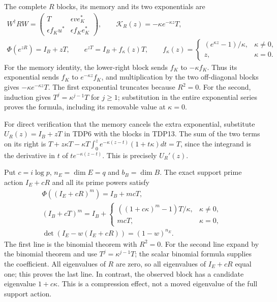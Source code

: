 The complete $R$ blocks, its memory and its two exponentials are
\begin{equation}\tag{TDP13}
\begin{gathered}
W^\dagger RW=
\begin{pmatrix}T&\epsilon ve_K^*\\
 \epsilon f_Ku^*&\epsilon f_Ke_K^*\end{pmatrix},\qquad
\mathcal K_R(z)=-\kappa e^{-\kappa z}T,\\
\Phi(e^{zR})=I_B+zT,\qquad
e^{zT}=I_B+f_\kappa(z)T,\qquad
f_\kappa(z)=\begin{cases}(e^{\kappa z}-1)/\kappa,&\kappa\ne0,\\
z,&\kappa=0.
\end{cases}
\end{gathered}
\end{equation}
For the memory identity, the lower-right block sends $f_K$ to
$-\kappa f_K$. Thus its exponential sends $f_K$ to
$e^{-\kappa z}f_K$, and multiplication by the two off-diagonal blocks
gives $-\kappa e^{-\kappa z}T$. The first exponential truncates because
$R^2=0$. For the second, induction gives $T^j=\kappa^{j-1}T$ for $j\ge1$;
substitution in the entire exponential series proves the formula,
including its removable value at $\kappa=0$.

For direct verification that the memory cancels the extra exponential,
substitute $U_R(z)=I_B+zT$ in TDP6 with the blocks in TDP13. The sum of
the two terms on its right is
$T+z\kappa T-\kappa T\int_0^z e^{-\kappa(z-t)}(1+t\kappa)dt=T$,
since the integrand is the derivative in $t$ of
$t e^{-\kappa(z-t)}$. This is precisely $U_R'(z)$.

Put $c=i\log p$, $n_E=\dim E=q$ and $b_B=\dim B$. The exact support
prime action $I_E+cR$ and all its prime powers satisfy
\begin{equation}\tag{TDP14}
\begin{gathered}
\Phi((I_E+cR)^m)=I_B+mcT,\\
(I_B+cT)^m=I_B+
\begin{cases}((1+c\kappa)^m-1)T/\kappa,&\kappa\ne0,\\
mcT,&\kappa=0,
\end{cases}\\
\det(I_E-w(I_E+cR))=(1-w)^{n_E}.
\end{gathered}
\end{equation}
The first line is the binomial theorem with $R^2=0$. For the second line
expand by the binomial theorem and use $T^j=\kappa^{j-1}T$; the scalar
binomial formula supplies the coefficient. All eigenvalues of $R$ are
zero, so all eigenvalues of $I_E+cR$ equal one; this proves the last line.
In contrast, the observed block has a candidate eigenvalue
$1+c\kappa$. This is a compression effect, not a moved eigenvalue of
the full support action.

